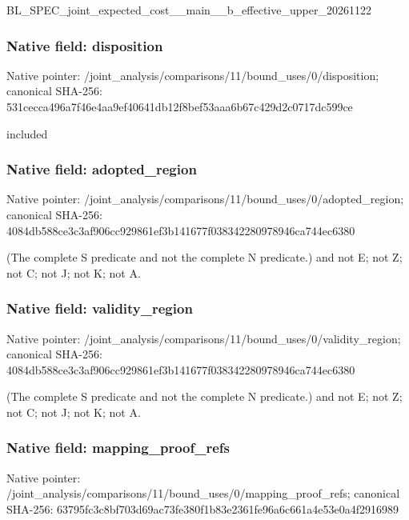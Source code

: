 \documentclass[10pt,a4paper]{article}
\begin{document}
BL\_SPEC\_joint\_expected\_c\allowbreak{}ost\_\_main\_\_b\_effective\_u\allowbreak{}pper\_20261122


\subsubsection{Native field: disposition}


Native pointer: /joint\_analysis/comparis\allowbreak{}ons/11/bound\_uses/0/disp\allowbreak{}osition; canonical SHA-256: 531cecca496a7f46e4aa9ef4\allowbreak{}0641db12f8bef53aaa6b67c4\allowbreak{}29d2c0717dc599ce


included


\subsubsection{Native field: adopted\_region}


Native pointer: /joint\_analysis/comparis\allowbreak{}ons/11/bound\_uses/0/adop\allowbreak{}ted\_region; canonical SHA-256: 4084db588ce3c3af906cc929\allowbreak{}861ef3b141677f0383422809\allowbreak{}78946ca744ec6380


(The complete S predicate and not the complete N predicate.) and not E; not Z; not C; not J; not K; not A.


\subsubsection{Native field: validity\_region}


Native pointer: /joint\_analysis/comparis\allowbreak{}ons/11/bound\_uses/0/vali\allowbreak{}dity\_region; canonical SHA-256: 4084db588ce3c3af906cc929\allowbreak{}861ef3b141677f0383422809\allowbreak{}78946ca744ec6380


(The complete S predicate and not the complete N predicate.) and not E; not Z; not C; not J; not K; not A.


\subsubsection{Native field: mapping\_proof\_refs}


Native pointer: /joint\_analysis/comparis\allowbreak{}ons/11/bound\_uses/0/mapp\allowbreak{}ing\_proof\_refs; canonical SHA-256: 63795fc3c8bf703d69ac73fe\allowbreak{}380f1b83e2361fe96a6c661a\allowbreak{}4e53e0a4f2916989
\end{document}
